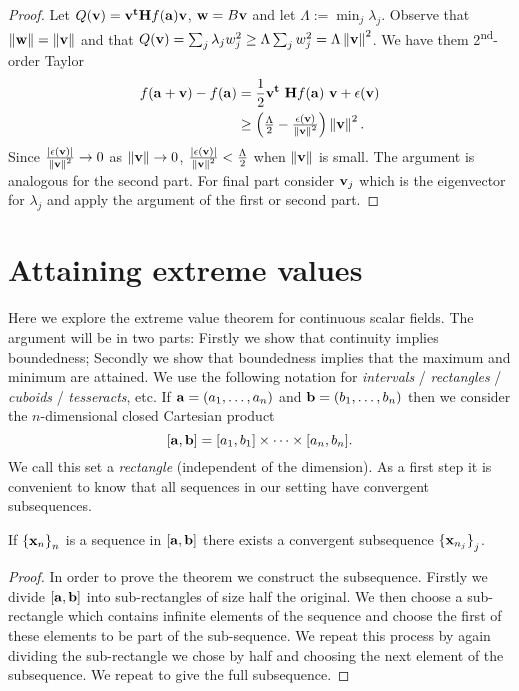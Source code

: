\begin{proof}
    Let \(Q(\vv) =  \vv^{\mathbf{t}} \mathbf{H} f (\aa) \vv  \),  \(\ww = B \vv\) and let \(\Lambda := \min_j \lambda_j\).
    Observe that \(\norm{\ww} =  \norm{\vv}\) and that \(Q(\vv)=  \sum_{j} \lambda_j w_j^2  \geq \Lambda \sum_{j} w_j^2 = \Lambda  \norm{\vv}^2 \).
    We have them 2\textsuperscript{nd}-order Taylor
    \[
        \begin{aligned}
            f(\aa+\vv) - f(\aa)
             & =  \frac{1}{2} \vv^{\mathbf{t}} \ \mathbf{H} f (\aa) \ \vv +  \epsilon(\vv)                \\
             & \geq  \left(\tfrac{\Lambda}{2} - \tfrac{\epsilon(\vv)}{\norm{\vv}^2} \right) \norm{\vv}^2.
        \end{aligned}
    \]
    Since \(\frac{\abs{\epsilon(\vv)}}{\norm{\vv}^2} \to 0\) as \(\norm{\vv}\to 0\), \( \frac{\abs{\epsilon(\vv)}}{\norm{\vv}^2} < \tfrac{\Lambda}{2}\) when \(\norm{\vv}\) is small.
    The argument is analogous for the second part. For final part consider \(\vv_j\) which is the eigenvector for \(\lambda_j\) and apply the argument of the first or second part.
\end{proof}

\section{Attaining extreme values}

Here we explore the extreme value theorem for continuous scalar fields.
The argument will be in two parts:
Firstly we show that continuity implies boundedness;
Secondly we show that boundedness implies that the maximum and minimum are attained.
We use the following notation for \emph{intervals} / \emph{rectangles} / \emph{cuboids} / \emph{tesseracts}, etc.
If \(\aa = (a_1,\ldots,a_n)\) and  \(\bb = (b_1,\ldots,b_n)\)
then we consider the \(n\)-dimensional closed Cartesian product
\[
    [\aa,\bb] = [a_1,b_1] \times \cdots \times [a_n,b_n].
\]
We call this set a \emph{rectangle} (independent of the dimension).
As a first step it is convenient to know that all sequences in our setting have convergent subsequences.

\begin{theorem}
    If \({\{\xx_{n}\}}_{n}\) is a sequence in \( [\aa,\bb]\)
    there exists a convergent subsequence \({\{\xx_{n_j}\}}_{j}\).
\end{theorem}

\begin{proof}
    In order to prove the theorem we construct the subsequence.
    Firstly we divide \( [\aa,\bb]\) into sub-rectangles of size half the original.
    We then choose a sub-rectangle which contains infinite elements of the sequence and choose the first of these elements to be part of the sub-sequence.
    We repeat this process by again dividing the sub-rectangle we chose by half and choosing the next element of the subsequence.
    We repeat to give the full subsequence.
\end{proof}

